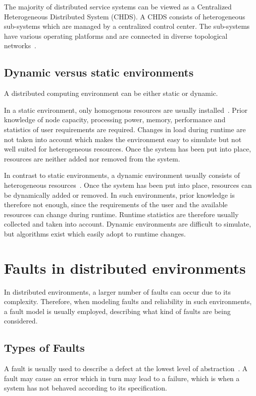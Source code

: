 \documentclass{cslthse-msc}
\begin{document}
The majority of distributed service systems can be viewed as a Centralized Heterogeneous Distributed System (CHDS). A CHDS consists of heterogeneous sub-systems which are managed by a centralized control center. The sub-systems have various operating platforms and are connected in diverse topological networks~\cite{studyServiceRel}.

\subsection{Dynamic versus static environments} \label{subsec:background_dyn_stat_env}
A distributed computing environment can be either static or dynamic.

In a static environment, only homogenous resources are usually installed~\cite{compStudyLoadAndCloud}. Prior knowledge of node capacity, processing power, memory, performance and statistics of user requirements are required. Changes in load during runtime are not taken into account which makes the environment easy to simulate but not well suited for heterogeneous resources. Once the system has been put into place, resources are neither added nor removed from the system.

In contrast to static environments, a dynamic environment usually consists of heterogeneous resources~\cite{compStudyLoadAndCloud}. Once the system has been put into place, resources can be dynamically added or removed. In such environments, prior knowledge is therefore not enough, since the requirements of the user and the available resources can change during runtime. Runtime statistics are therefore usually collected and taken into account. Dynamic environments are difficult to simulate, but algorithms exist which easily adopt to runtime changes. 


\section{Faults in distributed environments} \label{sec:background_faults_distr_env}
In distributed environments, a larger number of faults can occur due to its complexity. Therefore, when modeling faults and reliability in such environments, a fault model is usually employed, describing what kind of faults are being considered.

\subsection{Types of Faults} \label{subsec:background_types_of_faults}
A fault is usually used to describe a defect at the lowest level of abstraction~\cite{faultTolerantFundamentals}. A fault may cause an error which in turn may lead to a failure, which is when a system has not behaved according to its specification.
\end{document}
